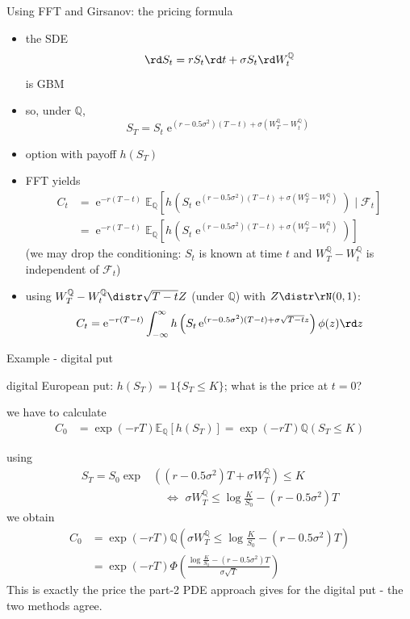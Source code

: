 \documentclass[pdf, handout]{beamer}
\newcommand{\e}{\operatorname{e}}
\begin{document}
\begin{frame}{Using FFT and Girsanov: the pricing formula}
\small{
\begin{itemize}
\item the SDE
\[
\rd S_t= rS_t \rd t + \sigma S_t \rd W_t^{\mathbb{Q}}
\]
is GBM
\item so, under $\mathbb{Q}$,
\[
S_T=S_t\e^{
(r-0.5\sigma^2) (T-t) +\sigma (W_T^{\mathbb{Q}}
-W_t^{\mathbb{Q}})
}
\]
\item option with payoff $h(S_T)$
\item FFT yields
\begin{align*}
C_t&=\e^{-r(T-t)}\mathbb{E}_{\mathbb{Q}}\left[ h\left(
S_t\e^{
(r-0.5\sigma^2) (T-t) +\sigma (W_T^{\mathbb{Q}}
-W_t^{\mathbb{Q}}) }\right) 
\mid  \mathcal{F}_t
\right]  \\
&=
\e^{-r(T-t)}\mathbb{E}_{\mathbb{Q}}\left[ h\left(
S_t\e^{
(r-0.5\sigma^2) (T-t) +\sigma (W_T^{\mathbb{Q}}
-W_t^{\mathbb{Q}}) }\right)
\right]
\end{align*}
{\footnotesize (we may drop the conditioning: $S_t$ is known at time $t$ and $W_T^{\mathbb{Q}}-W_t^{\mathbb{Q}}$ is independent of $\mathcal{F}_t$)}
\item using $W_T^{\mathbb{Q}}- W_t^{\mathbb{Q}}\distr \sqrt{T-t} Z$ (under $\mathbb{Q}$) with $Z\distr \rN(0,1)$:
\[
C_t=\e^{-r(T-t)}\int_{-\infty}^{\infty}
h\left( S_t\e^{
(r-0.5\sigma^2) (T-t) +\sigma \sqrt{T-t}z }\right) \phi(z) \rd z
\]
\end{itemize}
}
\end{frame}
%
\begin{frame}{Example - digital put}
\begin{itemize}
{\small
\item digital European put: $h(S_T)=1\{ S_T\leq K\}$; what is the price at $t=0$?
\item we have to calculate
\begin{align*}
C_0&=\exp(-rT)\mathbb{E}_{\mathbb{Q}}\left[ h\left(
S_T\right)\right]
= \exp(-rT) \mathbb{Q}\left( S_T\leq K\right)
\end{align*}
\item using
\begin{align*}
 S_T=S_0\exp&\left(
(r-0.5\sigma^2) T +\sigma W_T^{\mathbb{Q}} \right)\leq K \,\, \\ &\quad
\Leftrightarrow\,\,
\sigma W_T^{\mathbb{Q}}\leq \log \frac{K}{S_0} -(r-0.5\sigma^2) T
\end{align*}
we obtain
\begin{align*}
C_0&=\exp(-rT)\mathbb{Q}\left( \sigma W_T^{\mathbb{Q}}\leq \log \frac{K}{S_0} -(r-0.5\sigma^2) T \right)
\\
&
=\exp(-rT)\Phi\left(
\frac{
\log \frac{K}{S_0} -(r-0.5\sigma^2) T }{
\sigma\sqrt{T}}
\right)
\end{align*}
\medskip
This is exactly the price the part-2 PDE approach gives for the digital put - the two methods agree.}
\end{itemize}
\end{frame}
%
\end{document}
